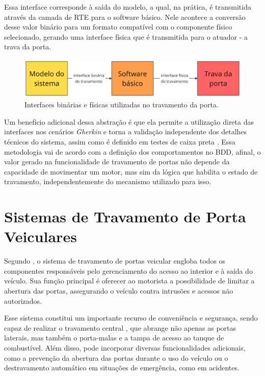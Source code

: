 Essa interface corresponde à saída do modelo, a qual, na prática, é transmitida através da camada de RTE para o software básico. Nele acontece a conversão desse 
valor binário para um formato compatível com o componente físico selecionado, gerando uma interface física que é transmitida para o atuador - a trava da porta. 

\begin{figure}[H]
\centering
\includegraphics[height=2cm]{figuras/diagrama_interface.png}
\caption{Interfaces binárias e físicas utilizadas no travamento da porta.}
\label{fig:diagramainterface}
\end{figure}

Um benefício adicional dessa abstração é que ela permite a utilização direta das interfaces nos cenários \textit{Gherkin} e torna a validação independente dos detalhes 
técnicos do sistema, assim como é definido em testes de caixa preta \cite{sommerville2019}. Essa metodologia vai de acordo com a definição dos comportamentos no BDD, 
afinal, o valor gerado na funcionalidade de travamento de portas não depende da capacidade de movimentar um motor, mas sim da lógica que habilita o estado de travamento, 
independentemente do mecanismo utilizado para isso.

\section{\textbf{Sistemas de Travamento de Porta Veiculares}}
Segundo , o sistema de travamento de portas veicular engloba todos os componentes responsáveis pelo gerenciamento do acesso ao interior 
e à saída do veículo. Sua função principal é oferecer ao motorista a possibilidade de limitar a abertura das portas, assegurando o veículo contra intrusões e acessos 
não autorizados.

Esse sistema constitui um importante recurso de conveniência e segurança, sendo capaz de realizar o travamento central \cite{reif2017locking}, que abrange não apenas 
as portas laterais, mas também o porta-malas e a tampa de acesso ao tanque de combustível. Além disso, pode incorporar diversas funcionalidades adicionais, como a 
prevenção da abertura das portas durante o uso do veículo ou o destravamento automático em situações de emergência, como em acidentes.

